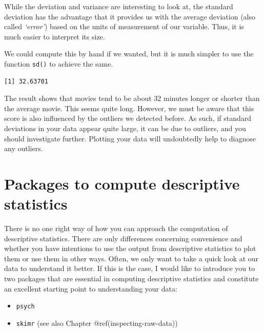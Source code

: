 \documentclass[
  letterpaper,
]{krantz}
\makeatletter
\newenvironment{Shaded}{\begin{snugshade}}{\end{snugshade}}
\newcommand{\FunctionTok}[1]{\textcolor[rgb]{0.28,0.35,0.67}{#1}}
\newcommand{\NormalTok}[1]{\textcolor[rgb]{0.00,0.23,0.31}{#1}}
\newcommand{\SpecialCharTok}[1]{\textcolor[rgb]{0.37,0.37,0.37}{#1}}
\newenvironment{kframe}{%
\medskip{}
\setlength{\fboxsep}{.8em}
 \def\at@end@of@kframe{}%
 \ifinner\ifhmode%
  \def\at@end@of@kframe{\end{minipage}}%
  \begin{minipage}{\columnwidth}%
 \fi\fi%
 \def\FrameCommand##1{\hskip\@totalleftmargin \hskip-\fboxsep
 \colorbox{shadecolor}{##1}\hskip-\fboxsep
     \hskip-\linewidth \hskip-\@totalleftmargin \hskip\columnwidth}%
 \MakeFramed {\advance\hsize-\width
   \@totalleftmargin\z@ \linewidth\hsize
   \@setminipage}}%
 {\par\unskip\endMakeFramed%
 \at@end@of@kframe}
\renewenvironment{Shaded}{\begin{kframe}}{\end{kframe}}
\makeatother
\begin{document}
While the deviation and variance are interesting to look at, the
standard deviation has the advantage that it provides us with the
average deviation (also called \emph{`error'}) based on the units of
measurement of our variable. Thus, it is much easier to interpret its
size.

We could compute this by hand if we wanted, but it is much simpler to
use the function \texttt{sd()} to achieve the same.

\begin{Shaded}
\end{Shaded}

\begin{verbatim}
[1] 32.63701
\end{verbatim}

The result shows that movies tend to be about 32 minutes longer or
shorter than the average movie. This seems quite long. However, we must
be aware that this score is also influenced by the outliers we detected
before. As such, if standard deviations in your data appear quite large,
it can be due to outliers, and you should investigate further. Plotting
your data will undoubtedly help to diagnose any outliers.

\section{Packages to compute descriptive
statistics}\label{sec-packages-for-descriptive-statistics}

There is no one right way of how you can approach the computation of
descriptive statistics. There are only differences concerning
convenience and whether you have intentions to use the output from
descriptive statistics to plot them or use them in other ways. Often, we
only want to take a quick look at our data to understand it better. If
this is the case, I would like to introduce you to two packages that are
essential in computing descriptive statistics and constitute an
excellent starting point to understanding your data:

\begin{itemize}
\item
  \texttt{psych}
\item
  \texttt{skimr} (see also Chapter @ref(inspecting-raw-data))
\end{itemize}
\end{document}
